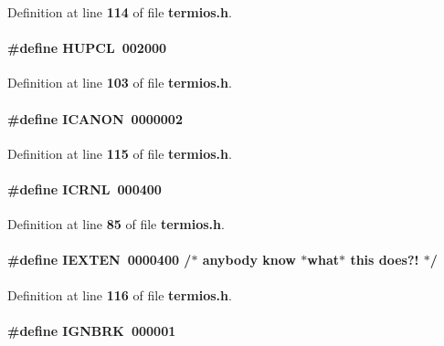 Definition at line {\bf 114} of file {\bf termios.\+h}.

\paragraph[{H\+U\+P\+CL}]{\setlength{\rightskip}{0pt plus 5cm}\#define H\+U\+P\+CL~002000}\label{termios_8h_af9d210a765b81afc6a40275185c4d5da}


Definition at line {\bf 103} of file {\bf termios.\+h}.

\paragraph[{I\+C\+A\+N\+ON}]{\setlength{\rightskip}{0pt plus 5cm}\#define I\+C\+A\+N\+ON~0000002}\label{termios_8h_a58265a371303d00a4a3b1f128d72c21e}


Definition at line {\bf 115} of file {\bf termios.\+h}.

\paragraph[{I\+C\+R\+NL}]{\setlength{\rightskip}{0pt plus 5cm}\#define I\+C\+R\+NL~000400}\label{termios_8h_ae0cbb5db9d8f8119864bb9537466c314}


Definition at line {\bf 85} of file {\bf termios.\+h}.

\paragraph[{I\+E\+X\+T\+EN}]{\setlength{\rightskip}{0pt plus 5cm}\#define I\+E\+X\+T\+EN~0000400 /$\ast$ anybody know $\ast$what$\ast$ this does?! $\ast$/}\label{termios_8h_ab64d018931a30f42a2590c5d997a41f2}


Definition at line {\bf 116} of file {\bf termios.\+h}.

\paragraph[{I\+G\+N\+B\+RK}]{\setlength{\rightskip}{0pt plus 5cm}\#define I\+G\+N\+B\+RK~000001}\label{termios_8h_a2fa5de0b1c54040022ec2edbafe68db7}


